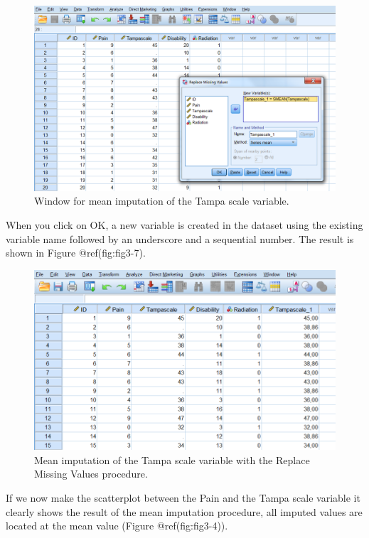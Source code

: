 \documentclass[
]{book}
\begin{document}
\begin{figure}

{\centering \includegraphics[width=0.7\linewidth]{images/fig3.6} 

}

\caption{Window for mean imputation of the Tampa scale variable.}\label{fig:fig3-3}
\end{figure}

When you click on OK, a new variable is created in the dataset using the
existing variable name followed by an underscore and a sequential
number. The result is shown in Figure @ref(fig:fig3-7).

\begin{figure}

{\centering \includegraphics[width=0.7\linewidth]{images/fig3.7} 

}

\caption{Mean imputation of the Tampa scale variable with the Replace Missing Values procedure.}\label{fig:fig3-7}
\end{figure}

If we now make the scatterplot between the Pain and the Tampa scale
variable it clearly shows the result of the mean imputation procedure,
all imputed values are located at the mean value (Figure
@ref(fig:fig3-4)).
\end{document}
